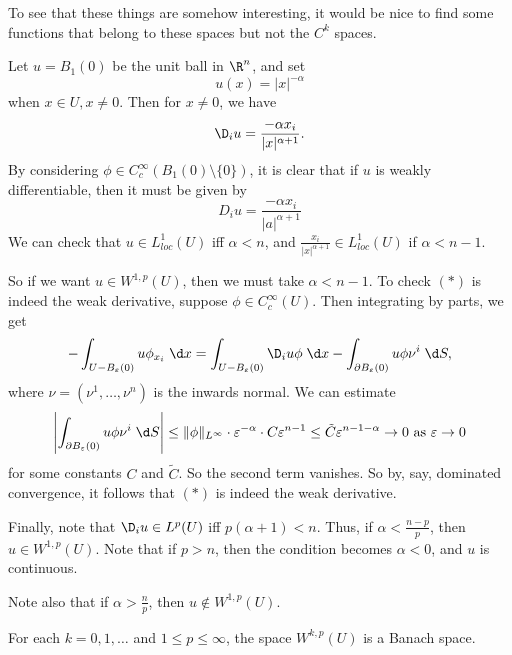 \documentclass[a4paper]{article}
\begin{document}
To see that these things are somehow interesting, it would be nice to find some functions that belong to these spaces but not the $C^k$ spaces.

\begin{eg}
  Let $u = B_1(0)$ be the unit ball in $\R^n$, and set
  \[
    u(x) = |x|^{-\alpha}
  \]
  when $x \in U, x \not= 0$. Then for $x \not= 0$, we have
  \[
    \D_i u = \frac{-\alpha x_i}{|x|^{\alpha + 1}}.
  \]
  By considering $\phi \in C_c^\infty(B_1(0) \setminus \{0\})$, it is clear that if $u$ is weakly differentiable, then it must be given by
  \[
    D_i u = \frac{-\alpha x_i}{|a|^{\alpha + 1}}\tag{$*$}
  \]
  We can check that $u \in L^1_{loc} (U)$ iff $\alpha < n$, and $\frac{x_i}{|x|^{\alpha + 1}} \in L^1_{loc}(U)$ if $\alpha < n - 1$.

  So if we want $u \in W^{1, p}(U)$, then we must take $\alpha < n - 1$. To check $(*)$ is indeed the weak derivative, suppose $\phi \in C^\infty_c(U)$. Then integrating by parts, we get
  \[
    - \int_{U - B_\varepsilon(0)}u \phi_{x_i} \;\d x = \int_{U - B_\varepsilon(0)} \D_i u \phi \;\d x - \int_{\partial B_\varepsilon(0)} u \phi \nu^i \;\d S,
  \]
  where $\nu = (\nu^1, \ldots, \nu^n)$ is the inwards normal. We can estimate
  \[
    \left|\int_{\partial B_\varepsilon(0)}u \phi \nu^i \;\d S\right| \leq \|\phi\|_{L^\infty} \cdot \varepsilon^{-\alpha } \cdot C \varepsilon^{n - 1} \leq \tilde{C} \varepsilon^{n - 1 - \alpha} \to 0\text{ as }\varepsilon \to 0
  \]
  for some constants $C$ and $\tilde{C}$. So the second term vanishes. So by, say, dominated convergence, it follows that $(*)$ is indeed the weak derivative.

  Finally, note that $\D_i u \in L^p(U)$ iff $p(\alpha + 1) < n$. Thus, if $\alpha < \frac{n - p}{p}$, then $u \in W^{1, p}(U)$. Note that if $p > n$, then the condition becomes $\alpha < 0$, and $u$ is continuous.

  Note also that if $\alpha > \frac{n}{p}$, then $u \not \in W^{1,p}(U)$.
\end{eg}

\begin{thm}
  For each $k = 0, 1, \ldots$ and $1 \leq p \leq \infty$, the space $W^{k, p}(U)$ is a Banach space.
\end{thm}
\end{document}
